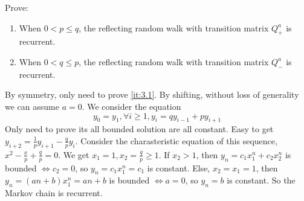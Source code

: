 \documentclass[../main]{subfiles}
\begin{document}
\begin{problem}\label{pro:3}
  Prove:
  \begin{enumerate}
    \item \label{it:3.1}When \(0 < p \leq q\), the reflecting random walk with transition matrix \(Q^a_+\) is recurrent.
    \item When \(0 < q \leq p\), the reflecting random walk with transition matrix \(Q^a_-\) is recurrent.
  \end{enumerate}
\end{problem}

\begin{solution}
  By symmetry, only need to prove \ref{it:3.1}. By shifting, without loss of generality we can assume \(a=0\).
  We consider the equation
  \[
    y_0=y_1,\forall i \geq 1,y_i=qy_{i-1}+py_{i+1}
  \]
  Only need to prove its all bounded solution are all constant.
  Easy to get \(y_{i+2}=\frac{1}{p}y_{i+1}-\frac{q}{p}y_{i}\).
  Consider the charasteristic equation of this sequence, \(x^2-\frac{x}{p}+\frac{q}{p}=0\).
  We get \(x_1=1,x_2=\frac{q}{p} \geq 1\).
  If \(x_2>1\), then \(y_n=c_1 x_1^n + c_2 x_2^n\) is bounded \(\iff c_2=0\), so \(y_n=c_1 x_1^n=c_1\) is constant.
  Else, \(x_2=x_1=1\), then \(y_n=(an+b)x_1^n=an+b\) is bounded \(\iff a=0\), so \(y_n=b\) is constant.
  So the Markov chain is recurrent.
\end{solution}
\end{document}
